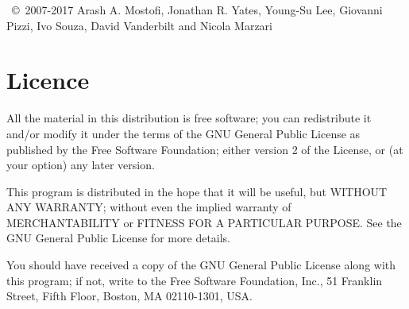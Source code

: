 \wannier\ \copyright\ 2007-2017 Arash A. Mostofi, Jonathan R. Yates,
Young-Su Lee, Giovanni Pizzi, Ivo Souza, David Vanderbilt and Nicola Marzari

\section*{Licence}
All the material in this distribution is free software; you can
redistribute it and/or 
modify it under the terms of the GNU General Public License
as published by the Free Software Foundation; either version 2
of the License, or (at your option) any later version.

This program is distributed in the hope that it will be useful,
but WITHOUT ANY WARRANTY; without even the implied warranty of
MERCHANTABILITY or FITNESS FOR A PARTICULAR PURPOSE.  See the
GNU General Public License for more details.

You should have received a copy of the GNU General Public License
along with this program; if not, write to the Free Software
Foundation, Inc., 51 Franklin Street, Fifth Floor, Boston, MA  02110-1301, USA.


 
